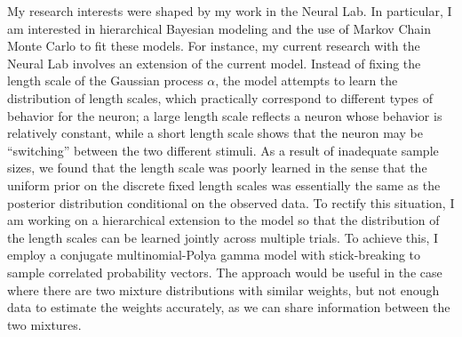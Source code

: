 \documentclass[12pt]{article}
\begin{document}
  My research interests were shaped by my work in the Neural Lab.  In particular, I am interested in hierarchical Bayesian modeling and the use of Markov Chain Monte Carlo to fit these models.  For instance, my current research with the Neural Lab involves an extension of the current model.  Instead of fixing the length scale of the Gaussian process $\alpha$, the model attempts to learn the distribution of length scales, which practically correspond to different types of behavior for the neuron; a large length scale reflects a neuron whose behavior is relatively constant, while a short length scale shows that the neuron may be ``switching'' between the two different stimuli.  As a result of inadequate sample sizes, we found that the length scale was poorly learned in the sense that the uniform prior on the discrete fixed length scales was essentially the same as the posterior distribution conditional on the observed data.  To rectify this situation, I am working on a hierarchical extension to the model so that the distribution of the length scales can be learned jointly across multiple trials.  To achieve this, I employ a conjugate multinomial-Polya gamma model with stick-breaking to sample correlated probability vectors.  The approach would be useful in the case where there are two mixture distributions with similar weights, but not enough data to estimate the weights accurately, as we can share information between the two mixtures.
\end{document}
